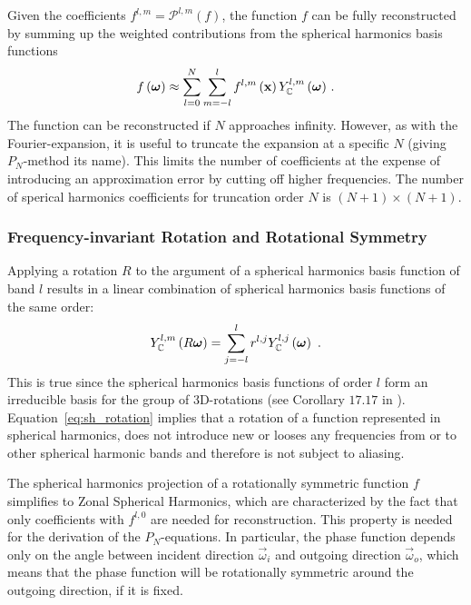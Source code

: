 Given the coefficients $f^{l, m} = \mathcal{P}^{l, m}(f)$, the function $f$ can be fully reconstructed by summing up the weighted contributions from the spherical harmonics basis functions
\begin{align}
\label{eq:sh_reconstruction}
f\left(\boldsymbol{\mathbf{\omega}}\right) \approx 
\sum_{l=0}^{N}
{
\sum_{m=-l}^{l}
{
f^{l,m}\left(\boldsymbol{\mathbf{x}}\right)Y_{\mathbb{C}}^{l,m}\left(\boldsymbol{\mathbf{\omega}}\right)
}
}
\ .
\end{align}
The function can be reconstructed if $N$ approaches infinity. However, as with the Fourier-expansion, it is useful to truncate the expansion at a specific $N$ (giving $P_N$-method its name). This limits the number of coefficients at the expense of introducing an approximation error by cutting off higher frequencies. The number of sperical harmonics coefficients for truncation order $N$ is $(N+1)\times(N+1)$.

\subsubsection*{Frequency-invariant Rotation and Rotational Symmetry}

Applying a rotation $R$ to the argument of a spherical harmonics basis function of band $l$ results in a linear combination of spherical harmonics basis functions of the same order:
\begin{align}
\label{eq:sh_rotation}
Y_{\mathbb{C}}^{l,m}\left(R\boldsymbol{\mathbf{\omega}}\right)=\sum_{j=-l}^{l}r^{l,j}Y_{\mathbb{C}}^{l,j}\left(\boldsymbol{\mathbf{\omega}}\right)
\ .
\end{align}
This is true since the spherical harmonics basis functions of order $l$ form an irreducible basis for the group of 3D-rotations (see Corollary $17.17$ in \cite{Hall13}). Equation~\ref{eq:sh_rotation} implies that a rotation of a function represented in spherical harmonics, does not introduce new or looses any frequencies from or to other spherical harmonic bands and therefore is not subject to aliasing.

The spherical harmonics projection of a rotationally symmetric function $f$ simplifies to Zonal Spherical Harmonics, which are characterized by the fact that only coefficients with $f^{l,0}$ are needed for reconstruction. This property is needed for the derivation of the $P_N$-equations. In particular, the phase function depends only on the angle between incident direction $\vec{\omega}_i$ and outgoing direction $\vec{\omega}_o$, which means that the phase function will be rotationally symmetric around the outgoing direction, if it is fixed. 

